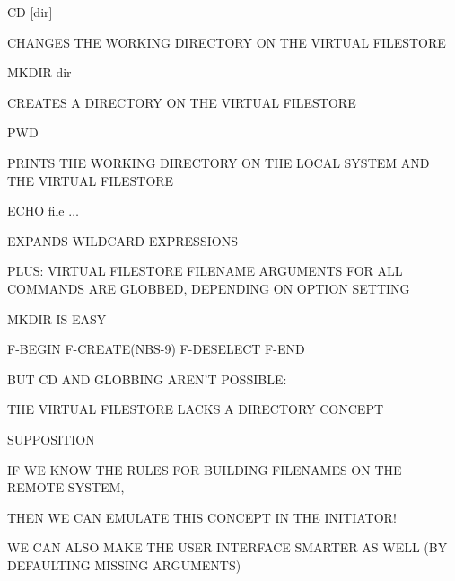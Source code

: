 \begin{bwslide}

\begin{nrtc}
\item	CD [dir]
    \begin{nrtc}
    \item	CHANGES THE WORKING DIRECTORY ON THE VIRTUAL FILESTORE
    \end{nrtc}

\item	MKDIR dir
    \begin{nrtc}
    \item	CREATES A DIRECTORY ON THE VIRTUAL FILESTORE
    \end{nrtc}

\item	PWD
    \begin{nrtc}
    \item	PRINTS THE WORKING DIRECTORY ON THE LOCAL SYSTEM AND THE
		VIRTUAL FILESTORE
    \end{nrtc}

\item	ECHO file $\ldots$
    \begin{nrtc}
    \item	EXPANDS WILDCARD EXPRESSIONS
    \end{nrtc}

\item	PLUS: VIRTUAL FILESTORE FILENAME ARGUMENTS FOR ALL COMMANDS ARE
	GLOBBED, DEPENDING ON OPTION SETTING
\end{nrtc}
\end{bwslide}


\begin{bwslide}

\begin{nrtc}
\item	MKDIR IS EASY
    \begin{nrtc}
    \item	F-BEGIN F-CREATE(NBS-9) F-DESELECT F-END
    \end{nrtc}

\item	BUT CD AND GLOBBING AREN'T POSSIBLE:
    \begin{nrtc}
    \item	THE VIRTUAL FILESTORE LACKS A DIRECTORY CONCEPT
    \end{nrtc}

\item	SUPPOSITION
    \begin{nrtc}
    \item	IF WE KNOW THE RULES FOR BUILDING FILENAMES ON THE REMOTE
		SYSTEM,

    \item	THEN WE CAN EMULATE THIS CONCEPT IN THE INITIATOR!

    \item	WE CAN ALSO MAKE THE USER INTERFACE SMARTER AS WELL
		(BY DEFAULTING MISSING ARGUMENTS)
    \end{nrtc}
\end{nrtc}
\end{bwslide}


